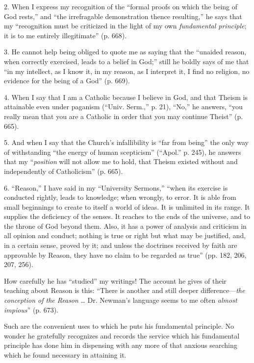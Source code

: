 2. When I express my recognition of the ``formal proofs on
which the being of God rests,'' and ``the irrefragable
demonstration thence resulting,'' he says that my
``recognition must be criticized in the light of my own \emph{fundamental
principle}; it is to me entirely illegitimate'' (p. 668).

3. He cannot help being obliged to quote me as saying that the
``unaided reason, when correctly exercised, leads to a belief in
God;'' still he boldly says of me that ``in my intellect, as I
know it, in my reason, as I interpret it, I find no religion, no
evidence for the being of a God'' (p. 669).

4. When I say that I am a Catholic because I believe in God, and
that Theism is attainable even under paganism (``Univ. Serm.,''
p. 21), ``No,'' he answers, ``you really mean that you are
a Catholic in order that you may continue Theist'' (p. 665).

5. And when I say that the Church's infallibility is ``far from
being'' the only way of withstanding ``the energy of human
scepticism'' (``Apol.'' p. 245), he answers that my ``\emph{position}
will not allow me to hold, that Theism existed without and
independently of Catholicism'' (p. 665).

6. ``Reason,'' I have said in my ``University
Sermons,'' ``when its exercise is conducted rightly, leads to
knowledge; when wrongly, to error. It is able from small beginnings to
create to itself a world of ideas. It is unlimited in its range. It
supplies the deficiency of the senses. It reaches to the ends of the
universe, and to the throne of God beyond them. Also, it has a power
of analysis and criticism in all opinion and conduct; nothing is true
or right but what may be justified, and, in a certain sense, proved by
it; and unless the doctrines received by faith are approvable by
Reason, they have no claim to be regarded as true'' (pp. 182, 206,
207, 256).

How carefully he has ``studied'' my writings! The account
he gives of their teaching about Reason is this: ``There is
another and still deeper difference—\emph{the conception of the Reason}
… Dr. Newman's language seems to me often \emph{almost impious}''
(p. 673).

Such are the convenient uses to which he puts his fundamental principle. No wonder he gratefully recognizes and records the service
which his fundamental principle has done him in dispensing with any
more of that anxious searching which he found necessary in attaining
it.

